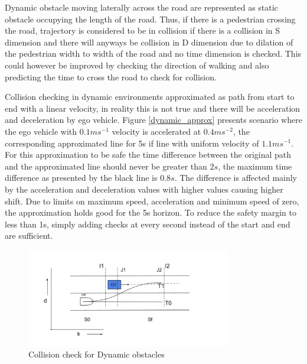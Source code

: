 Dynamic obstacle moving laterally across the road are represented as static obstacle occupying the length of the road. Thus, if there is a pedestrian crossing the road, trajectory is considered to be in collision if there is a collision in S dimension and there will anyways be collision in D dimension due to dilation of the pedestrian width to width of the road and no time dimension is checked. This could however be improved by checking the direction of walking and also predicting the time to cross the road to check for collision. 

Collision checking in dynamic environments approximated as path from start to end with a linear velocity, in reality this is not true and there will be acceleration and deceleration by ego vehicle. Figure \ref{dynamic_approx} presents scenario where the ego vehicle with $0.1ms^{-1}$ velocity is accelerated at $0.4ms^{-2}$, the corresponding approximated line for 5s if line with uniform velocity of $1.1ms^{-1}$. For this approximation to be safe the time difference between the original path and the approximated line should never be greater than $2s$, the maximum time difference as presented by the black line is $0.8s$. The difference is affected mainly by the acceleration and deceleration values with higher values causing higher shift. Due to limits on maximum speed, acceleration and minimum speed of zero, the approximation holds good for the 5s horizon. To reduce the safety margin to less than 1s, simply adding checks at every second instead of the start and end are sufficient. 



 \begin{figure}
    \centering
    \includegraphics[width=0.8\textwidth]{Images/dynamic_check.png}
    \caption{Collision check for Dynamic obstacles}
    \label{dynamic_check}
\end{figure}

